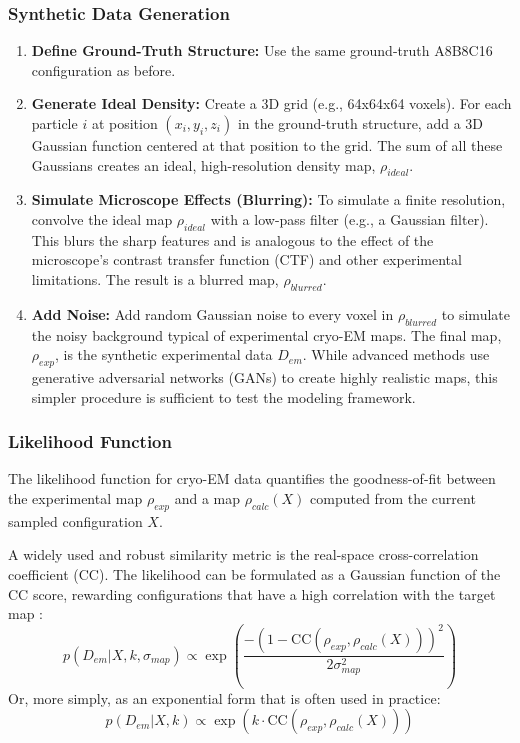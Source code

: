 \documentclass{article}
\begin{document}
\subsubsection{Synthetic Data Generation}

\begin{enumerate}
  \item \textbf{Define Ground-Truth Structure:} Use the same ground-truth A8B8C16 configuration as before.
  \item \textbf{Generate Ideal Density:} Create a 3D grid (e.g., 64x64x64 voxels). For each particle $i$ at position $(x_i, y_i, z_i)$ in the ground-truth structure, add a 3D Gaussian function centered at that position to the grid. The sum of all these Gaussians creates an ideal, high-resolution density map, $\rho_{ideal}$.\cite{ref30}
  \item \textbf{Simulate Microscope Effects (Blurring):} To simulate a finite resolution, convolve the ideal map $\rho_{ideal}$ with a low-pass filter (e.g., a Gaussian filter). This blurs the sharp features and is analogous to the effect of the microscope's contrast transfer function (CTF) and other experimental limitations.\cite{ref31} The result is a blurred map, $\rho_{blurred}$.
  \item \textbf{Add Noise:} Add random Gaussian noise to every voxel in $\rho_{blurred}$ to simulate the noisy background typical of experimental cryo-EM maps. The final map, $\rho_{exp}$, is the synthetic experimental data $D_{em}$. While advanced methods use generative adversarial networks (GANs) to create highly realistic maps, this simpler procedure is sufficient to test the modeling framework.\cite{ref32}
\end{enumerate}

\subsubsection{Likelihood Function}

The likelihood function for cryo-EM data quantifies the goodness-of-fit between the experimental map $\rho_{exp}$ and a map $\rho_{calc}(X)$ computed from the current sampled configuration $X$.

A widely used and robust similarity metric is the real-space cross-correlation coefficient (CC). The likelihood can be formulated as a Gaussian function of the CC score, rewarding configurations that have a high correlation with the target map \cite{ref5}:
\[ p(D_{em} | X, k, \sigma_{map}) \propto \exp\left( \frac{-(1 - \text{CC}(\rho_{exp}, \rho_{calc}(X)))^2}{2\sigma_{map}^2} \right) \]
Or, more simply, as an exponential form that is often used in practice:
\[ p(D_{em} | X, k) \propto \exp(k \cdot \text{CC}(\rho_{exp}, \rho_{calc}(X))) \]
\end{document}
